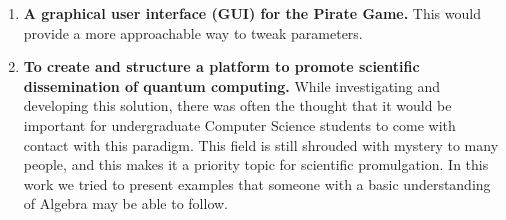 \begin{enumerate}
\item \textbf{A graphical user interface (GUI) for the Pirate Game.} This would provide a more approachable way to tweak parameters.

\item \textbf{To create and structure a platform to promote scientific dissemination of quantum computing.} While investigating and developing this solution, there was often the thought that it would be important for undergraduate Computer Science students to come with contact with this paradigm. This field is still shrouded with mystery to many people, and this makes it a priority topic for scientific promulgation. In this work we tried to present examples that someone with a basic understanding of Algebra may be able to follow.
\end{enumerate}

\cleardoublepage